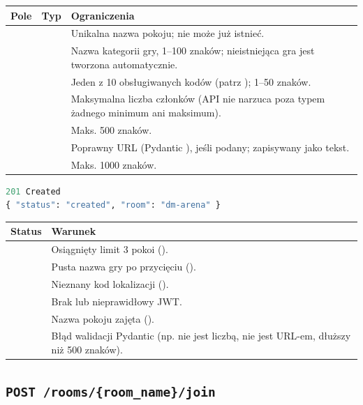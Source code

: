 \begin{tabularx}{\textwidth}{llY}
\toprule
Pole & Typ & Ograniczenia \\
\midrule
{} &  & Unikalna nazwa pokoju; nie może już istnieć. \\
 &  & Nazwa kategorii gry, 1--100 znaków; nieistniejąca gra jest tworzona automatycznie. \\
 &  & Jeden z 10 obsługiwanych kodów (patrz ); 1--50 znaków. \\
 &  & Maksymalna liczba członków (API nie narzuca poza typem  żadnego minimum ani maksimum). \\
 &  & Maks. 500 znaków. \\
 &  & Poprawny URL (Pydantic ), jeśli podany; zapisywany jako tekst. \\
 &  & Maks. 1000 znaków. \\
\bottomrule
\end{tabularx}

\begin{lstlisting}[language=Python]
201 Created
{ "status": "created", "room": "dm-arena" }
\end{lstlisting}

\begin{tabularx}{\textwidth}{lY}
\toprule
Status & Warunek \\
\midrule
{} & Osiągnięty limit 3 pokoi (). \\
 & Pusta nazwa gry po przycięciu (). \\
 & Nieznany kod lokalizacji (). \\
 & Brak lub nieprawidłowy JWT. \\
 & Nazwa pokoju zajęta (). \\
 & Błąd walidacji Pydantic (np.  nie jest liczbą,  nie jest URL-em,  dłuższy niż 500 znaków). \\
\bottomrule
\end{tabularx}

\subsection{\texttt{POST /rooms/\{room\_name\}/join}}


